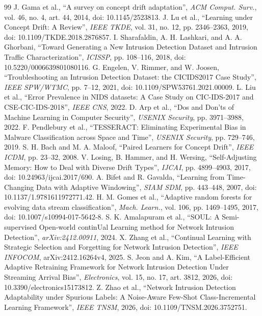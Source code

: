 \begin{thebibliography}{99}
 J. Gama et al., ``A survey on concept drift adaptation'', \emph{ACM Comput. Surv.}, vol. 46, no. 4, art. 44, 2014, doi: 10.1145/2523813.
 J. Lu et al., ``Learning under Concept Drift: A Review'', \emph{IEEE TKDE}, vol. 31, no. 12, pp. 2346--2363, 2019, doi: 10.1109/TKDE.2018.2876857.
 I. Sharafaldin, A. H. Lashkari, and A. A. Ghorbani, ``Toward Generating a New Intrusion Detection Dataset and Intrusion Traffic Characterization'', \emph{ICISSP}, pp. 108--116, 2018, doi: 10.5220/0006639801080116.
 G. Engelen, V. Rimmer, and W. Joosen, ``Troubleshooting an Intrusion Detection Dataset: the CICIDS2017 Case Study'', \emph{IEEE SPW/WTMC}, pp. 7--12, 2021, doi: 10.1109/SPW53761.2021.00009.
 L. Liu et al., ``Error Prevalence in NIDS datasets: A Case Study on CIC-IDS-2017 and CSE-CIC-IDS-2018'', \emph{IEEE CNS}, 2022.
 D. Arp et al., ``Dos and Don'ts of Machine Learning in Computer Security'', \emph{USENIX Security}, pp. 3971--3988, 2022.
 F. Pendlebury et al., ``TESSERACT: Eliminating Experimental Bias in Malware Classification across Space and Time'', \emph{USENIX Security}, pp. 729--746, 2019.
 S. H. Bach and M. A. Maloof, ``Paired Learners for Concept Drift'', \emph{IEEE ICDM}, pp. 23--32, 2008.
 V. Losing, B. Hammer, and H. Wersing, ``Self-Adjusting Memory: How to Deal with Diverse Drift Types'', \emph{IJCAI}, pp. 4899--4903, 2017, doi: 10.24963/ijcai.2017/690.
 A. Bifet and R. Gavalda, ``Learning from Time-Changing Data with Adaptive Windowing'', \emph{SIAM SDM}, pp. 443--448, 2007, doi: 10.1137/1.9781611972771.42.
 H. M. Gomes et al., ``Adaptive random forests for evolving data stream classification'', \emph{Mach. Learn.}, vol. 106, pp. 1469--1495, 2017, doi: 10.1007/s10994-017-5642-8.
 S. K. Amalapuram et al., ``SOUL: A Semi-supervised Open-world continUal Learning method for Network Intrusion Detection'', \emph{arXiv:2412.00911}, 2024.
 X. Zhang et al., ``Continual Learning with Strategic Selection and Forgetting for Network Intrusion Detection'', \emph{IEEE INFOCOM}, arXiv:2412.16264v4, 2025.
 S. Jeon and A. Kim, ``A Label-Efficient Adaptive Retraining Framework for Network Intrusion Detection Under Streaming Arrival Bias'', \emph{Electronics}, vol. 15, no. 17, art. 3812, 2026, doi: 10.3390/electronics15173812.
 Z. Zhao et al., ``Network Intrusion Detection Adaptability under Spurious Labels: A Noise-Aware Few-Shot Class-Incremental Learning Framework'', \emph{IEEE TNSM}, 2026, doi: 10.1109/TNSM.2026.3752751.

\end{thebibliography}

